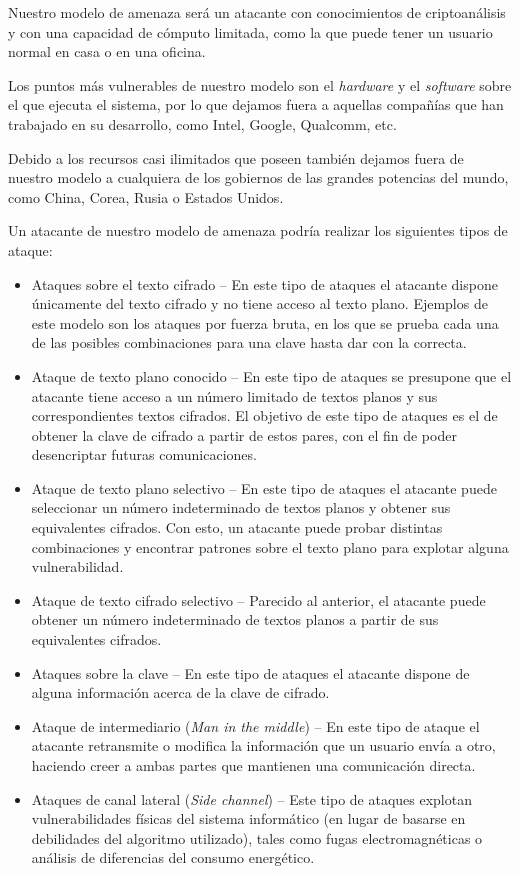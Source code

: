 Nuestro modelo de amenaza será un atacante con conocimientos de criptoanálisis y con una capacidad de cómputo limitada, como la que puede tener un usuario normal en casa o en una oficina.

Los puntos más vulnerables de nuestro modelo son el \emph{hardware} y el \emph{software} sobre el que ejecuta el sistema, por lo que dejamos fuera a aquellas compañías que han trabajado en su desarrollo, como Intel, Google, Qualcomm, etc.

Debido a los recursos casi ilimitados que poseen también dejamos fuera de nuestro modelo a cualquiera de los gobiernos de las grandes potencias del mundo, como China, Corea, Rusia o Estados Unidos.

Un atacante de nuestro modelo de amenaza podría realizar los siguientes tipos de ataque:

\begin{itemize}
  \item Ataques sobre el texto cifrado -- En este tipo de ataques el atacante dispone únicamente del texto cifrado y no tiene acceso al texto plano. Ejemplos de este modelo son los ataques por fuerza bruta, en los que se prueba cada una de las posibles combinaciones para una clave hasta dar con la correcta.

  \item Ataque de texto plano conocido -- En este tipo de ataques se presupone que el atacante tiene acceso a un número limitado de textos planos y sus correspondientes textos cifrados. El objetivo de este tipo de ataques es el de obtener la clave de cifrado a partir de estos pares, con el fin de poder desencriptar futuras comunicaciones.

  \item Ataque de texto plano selectivo -- En este tipo de ataques el atacante puede seleccionar un número indeterminado de textos planos y obtener sus equivalentes cifrados. Con esto, un atacante puede probar distintas combinaciones y encontrar patrones sobre el texto plano para explotar alguna vulnerabilidad.

  \item Ataque de texto cifrado selectivo -- Parecido al anterior, el atacante puede obtener un número indeterminado de textos planos a partir de sus equivalentes cifrados.

  \item Ataques sobre la clave -- En este tipo de ataques el atacante dispone de alguna información acerca de la clave de cifrado.

  \item Ataque de intermediario (\emph{Man in the middle}) -- En este tipo de ataque el atacante retransmite o modifica la información que un usuario envía a otro, haciendo creer a ambas partes que mantienen una comunicación directa.

  \item Ataques de canal lateral (\emph{Side channel}) -- Este tipo de ataques explotan vulnerabilidades físicas del sistema informático (en lugar de basarse en debilidades del algoritmo utilizado), tales como fugas electromagnéticas o análisis de diferencias del consumo energético.
\end{itemize} \emph{\parencite{Reference20}}\\

